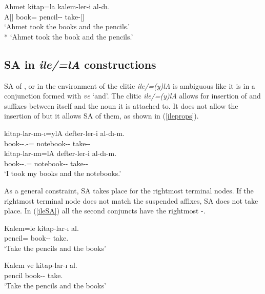 \begin{exe}
    \ex \label{ileandSA}
    \begin{xlist}
    \ex \gll Ahmet kitap=la kalem-ler-i al-dı. \\ 
    A[{\Nom}] book={\And} pencil-{\Pl}-{\Acc} take-{\Pst}[{\Tsg}] \\
    \glt `Ahmet took the books and the pencils.'\\*
    `Ahmet took the book and the pencils.'
    \end{xlist}
\end{exe}


\subsection{SA in \textit{ile/=lA} constructions}

SA of {\Pl}, or {\Poss} in the environment of the clitic \textit{ile/=(y)lA} is ambiguous like it is in a conjunction formed with \textit{ve} `and'. The clitic \textit{ile/=(y)lA} allows for insertion of {\Pl} and {\Poss} suffixes between itself and the noun it is attached to. It does not allow the insertion of {\Case} but it allows SA of them, as shown in (\ref{ileprops}).

\begin{exe}
\ex \label{ileprops}
    \begin{xlist}
    \ex \gll *kitap-lar-ım-ı=ylA defter-ler-i al-dı-m. \\ 
    book-{\Pl}-{\Poss}.{\Fsg}-{\Acc}={\And} notebook-{\Pl}-{\Acc} take-{\Pst}-{\Fsg} \\

    \ex \gll kitap-lar-ım=lA defter-ler-i al-dı-m. \\ 
    book-{\Pl}-{\Poss}.{\Fsg}={\And} notebook-{\Pl}-{\Acc} take-{\Pst}-{\Fsg} \\
    \glt `I took my books and the notebooks.'
\end{xlist}
\end{exe}

As a general constraint, SA takes place for the rightmost terminal nodes. If the rightmost terminal node does not match the suspended affixes, SA does not take place. In (\ref{ileSA}) all the second conjuncts have the rightmost {\Pl-\Acc}. 

\begin{exe}
    \ex \label{ileSA}
    \begin{xlist}
        \ex \label{ilesa1}\gll Kalem=le kitap-lar-ı al. \\ 
        pencil={\Case} book-{\Pl}-{\Acc} take.{\Imp} \\
        \glt `Take the pencils and the books'
        
        \ex \label{ilesa2}\gll Kalem ve kitap-lar-ı al. \\ 
        pencil {\And} book-{\Pl}-{\Acc} take.{\Imp} \\
        \glt `Take the pencils and the books'
    \end{xlist}
\end{exe}

